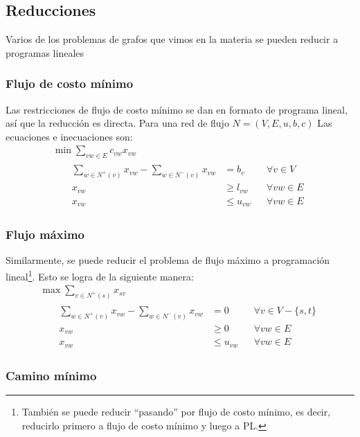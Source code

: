 \documentclass[a4paper]{report}
\begin{document}
\subsection{Reducciones}

Varios de los problemas de grafos que vimos en la materia se pueden reducir a programas lineales

\subsubsection{Flujo de costo mínimo}

Las restricciones de flujo de costo mínimo se dan en formato de programa lineal, así que la reducción es directa. Para una red de flujo $N = (V, E, u, b, c)$ Las ecuaciones e inecuaciones son:
\begin{gather*}
    \min{\sum_{vw \in E} c_{vw} x_{vw}} \\
    \begin{flalign*}
        && \sum_{w \in N^+(v)} x_{vw} - \sum_{w \in N^-(v)} x_{vw} & = b_v && \forall v \in V \\
        && x_{vw} & \geq l_{vw} && \forall vw \in E \\
        && x_{vw} & \leq u_{vw} && \forall vw \in E
    \end{flalign*}
\end{gather*}

\subsubsection{Flujo máximo}

Similarmente, se puede reducir el problema de flujo máximo a programación lineal\footnote{También se puede reducir ``pasando'' por flujo de costo mínimo, es decir, reducirlo primero a flujo de costo mínimo y luego a PL.}. Esto se logra de la siguiente manera:
\begin{gather*}
    \max{\sum_{v \in N^+(s)} x_{sv}} \\
    \begin{flalign*}
        && \sum_{w \in N^+(v)} x_{vw} - \sum_{w \in N^-(v)} x_{vw} & = 0 && \forall v \in V - \{s, t\} \\
        && x_{vw} & \geq 0 && \forall vw \in E \\
        && x_{vw} & \leq u_{vw} && \forall vw \in E
    \end{flalign*}
\end{gather*}

\subsubsection{Camino mínimo}
\end{document}

